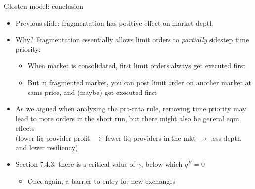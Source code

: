 \documentclass[english,10pt
,aspectratio=169
]{beamer}
\begin{document}
\begin{frame}{Glosten model: conclusion}
	\begin{itemize}
		\item Previous slide: fragmentation has positive effect on market depth
		\item Why?  Fragmentation essentially allows limit orders to \textit{partially} sidestep time priority:
		\begin{itemize}
			\item When market is consolidated, first limit orders always get executed first
			\item But in fragmented market, you can post limit order on another market at same price, and (maybe) get executed first
		\end{itemize}
		\item As we argued when analyzing the pro-rata rule, removing time priority may lead to more orders in the short run, but there might also be general eqm effects
		\\ (lower liq provider profit $\to$ fewer liq providers in the mkt $\to$ less depth and lower resiliency)
		\item Section 7.4.3: there is a critical value of $\gamma$, below which $q^E=0$
		\begin{itemize}
			\item Once again, a barrier to entry for new exchanges
		\end{itemize}
	\end{itemize}
\end{frame}
\end{document}
